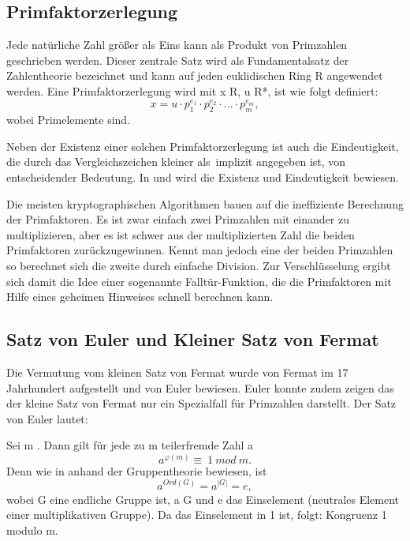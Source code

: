 	\subsection{Primfaktorzerlegung}
	Jede natürliche Zahl größer als Eins kann als Produkt von Primzahlen geschrieben werden. Dieser zentrale Satz wird als Fundamentalsatz der Zahlentheorie bezeichnet und kann auf jeden euklidischen Ring R angewendet werden. Eine Primfaktorzerlegung wird mit x \myin R, u \myin R*,  \myin {} ist wie folgt definiert:	
	\begin{displaymath}
		x = u \cdot p^{e_1}_1 \cdot p^{e_2}_2 \cdot . . . \cdot p^{e_m}_m,
	\end{displaymath}
	wobei   Primelemente sind.
	

	Neben der Existenz einer solchen Primfaktorzerlegung ist auch die Eindeutigkeit, die durch das Vergleichszeichen \grqq kleiner als\grqq ~implizit angegeben ist, von entscheidender Bedeutung. In \cite{Einfuehrung:in:Algebra:und:Zahlentheorie} und \cite{Algorithmische:Zahlentheorie} wird die Existenz und Eindeutigkeit bewiesen.

	
	Die meisten kryptographischen Algorithmen bauen auf die ineffiziente Berechnung der Primfaktoren. Es ist zwar einfach zwei Primzahlen mit einander zu multiplizieren, aber es ist schwer aus der multiplizierten Zahl die beiden Primfaktoren zurückzugewinnen. Kennt man jedoch eine der beiden Primzahlen so berechnet sich die zweite durch einfache Division. Zur Verschlüsselung ergibt sich damit die Idee einer sogenannte Falltür-Funktion, die die Primfaktoren mit Hilfe eines geheimen Hinweises schnell berechnen kann.
		
	\subsection{Satz von Euler und Kleiner Satz von Fermat}
	Die Vermutung vom kleinen Satz von Fermat wurde von Fermat im 17 Jahrhundert aufgestellt und von Euler bewiesen. Euler konnte zudem zeigen das der kleine Satz von Fermat nur ein Spezialfall für Primzahlen darstellt. Der Satz von Euler lautet:
	
	Sei m  \myin {}. Dann gilt für jede zu m teilerfremde Zahl a \myin {}
	\begin{displaymath}
		a^{\varphi(m)} \equiv~1~mod~m.
	\end{displaymath}
	Denn wie in \cite{Algorithmische:Zahlentheorie} anhand der Gruppentheorie bewiesen, ist
	\begin{displaymath}
		a^{Ord(G)} = a^{|G|} = e,
	\end{displaymath}
	wobei G eine endliche Gruppe ist, a \myin G und e das Einselement (neutrales Element einer multiplikativen Gruppe). Da das Einselement in  1 ist, folgt: Kongruenz 1 modulo m. 
	

